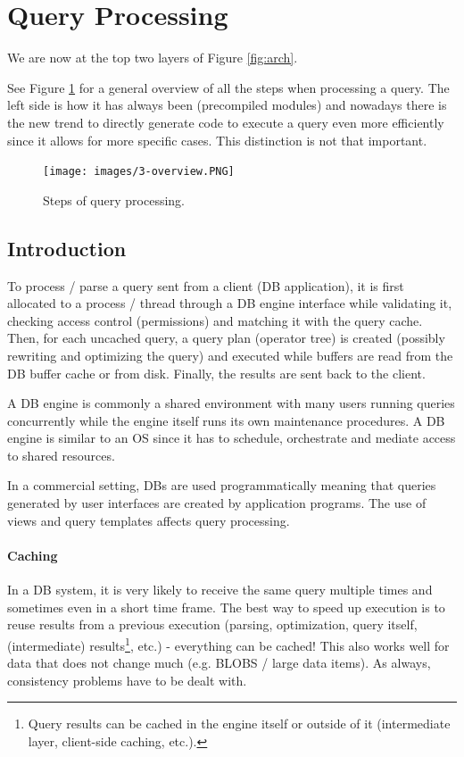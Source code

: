 \section{Query Processing}

We are now at the top two layers of Figure \ref{fig:arch}.

See Figure \ref{fig:overview} for a general overview of all the steps when processing a query. The left side is how it has always been (precompiled modules) and nowadays there is the new trend to directly generate code to execute a query even more efficiently since it allows for more specific cases. This distinction is not that important.

\begin{figure}[h]
	\centering
	\texttt{[image: images/3-overview.PNG]}
	\caption{Steps of query processing.}
	\label{fig:overview}
\end{figure}



\subsection{Introduction}

To process / parse a query sent from a client (DB application), it is first allocated to a process / thread through a DB engine interface while validating it, checking access control (permissions) and matching it with the query cache. Then, for each uncached query, a query plan (operator tree) is created (possibly rewriting and optimizing the query) and executed while buffers are read from the DB buffer cache or from disk. Finally, the results are sent back to the client.

A DB engine is commonly a shared environment with many users running queries concurrently while the engine itself runs its own maintenance procedures. A DB engine is similar to an OS since it has to schedule, orchestrate and mediate access to shared resources.

In a commercial setting, DBs are used programmatically meaning that queries generated by user interfaces are created by application programs. The use of views and query templates affects query processing.


\paragraph{Caching}
In a DB system, it is very likely to receive the same query multiple times and sometimes even in a short time frame. The best way to speed up execution is to reuse results from a previous execution (parsing, optimization, query itself, (intermediate) results\footnote{Query results can be cached in the engine itself or outside of it (intermediate layer, client-side caching, etc.).}, etc.) - everything can be cached! This also works well for data that does not change much (e.g. BLOBS / large data items). As always, consistency problems have to be dealt with.


